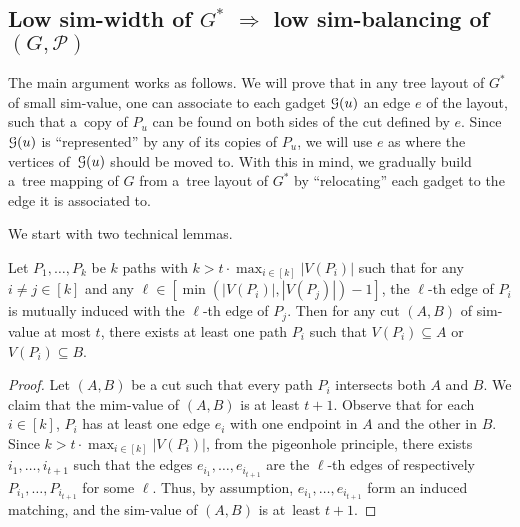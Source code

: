 \documentclass[a4paper,UKenglish,cleveref,hyperref,autoref]{lipics-v2021}
\newcommand{\tmap}{tree mapping\xspace}
\begin{document}
\subsection{Low sim-width of $G^*$ $\Rightarrow$ low sim-balancing of~$(G,\mathcal P)$}\label{sec:sim-width-to-sim-balancing}




The main argument works as follows.
We will prove that in any tree layout of $G^*$ of small sim-value, one can associate to each gadget $\mathcal G(u)$ an edge $e$ of the layout, such that a~copy of $P_u$ can be found on both sides of the cut defined by $e$.
Since $\mathcal G(u)$ is ``represented'' by any of its copies of $P_u$, we will use $e$ as where the vertices of~$\mathcal G(u)$ should be moved to.
With this in mind, we gradually build a~\tmap of $G$ from a~tree layout of $G^*$ by ``relocating'' each gadget to the edge it is associated to.

We start with two technical lemmas.

\begin{lemma}\label{lem:cut-doesnt-cut}
Let $P_1, \dots, P_k$ be $k$ paths with $k > t \cdot \max_{i \in [k]} |V(P_i)|$ such that for any $i \neq j \in [k]$ and any $\ell \in [\min(|V(P_i)|,|V(P_j)|)-1]$, the $\ell$-th edge of $P_i$ is mutually induced with the $\ell$-th edge of $P_j$.
Then for any cut $(A, B)$ of sim-value at most $t$, there exists at least one path $P_i$ such that $V(P_i)\subseteq A$ or $V(P_i)\subseteq B$.
\end{lemma}
\begin{proof}
	Let $(A, B)$ be a cut such that every path $P_i$ intersects both $A$ and $B$.
	We claim that the mim-value of $(A,B)$ is at least $t+1$.
	Observe that for each $i \in [k]$, $P_i$ has at least one edge $e_i$ with one endpoint in $A$ and the other in $B$.
	Since $k > t \cdot \max_{i \in [k]} |V(P_i)|$, from the pigeonhole principle, there exists $i_1,\dots,i_{t+1}$ such that the edges $e_{i_1},\dots,e_{i_{t+1}}$ are the $\ell$-th edges of respectively $P_{i_1}, \ldots,P_{i_{t+1}}$ for some $\ell$.
        Thus, by assumption, $e_{i_1},\dots,e_{i_{t+1}}$ form an induced matching, and the sim-value of $(A,B)$ is at~least $t+1$.
\end{proof}
\end{document}
